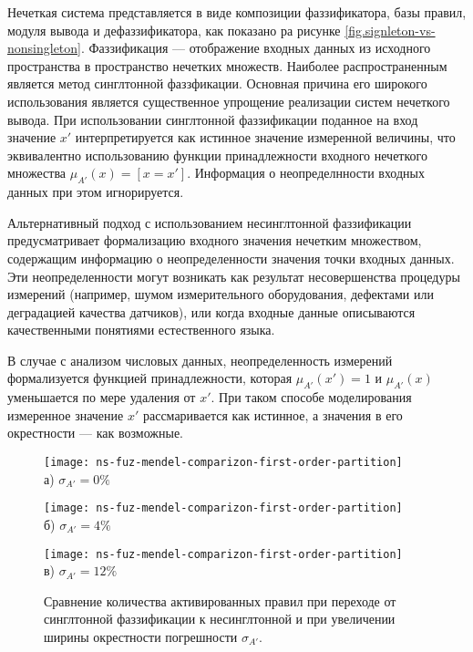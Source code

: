 Нечеткая система представляется в виде композиции фаззификатора, базы правил, модуля вывода и дефаззификатора, как показано ра рисунке \cref{fig.signleton-vs-nonsingleton}. Фаззификация --- отображение входных данных из исходного пространства в пространство нечетких множеств. Наиболее распространенным является метод синглтонной фаззфикации. Основная причина его широкого использования является существенное упрощение реализации систем нечеткого вывода. При использовании синглтонной фаззификации поданное на вход значение $x'$ интерпретируется как истинное значение измеренной величины, что эквивалентно использованию функции принадлежности входного нечеткого множества $\mu_{A'}(x) = \left[x = x'\right]$. Информация о неопределнности входных данных при этом игнорируется.

Альтернативный подход с использованием несинглтонной фаззификации предусматривает формализацию входного значения нечетким множеством, содержащим информацию о неопределенности значения точки входных данных. Эти неопределенности могут возникать как результат несовершенства процедуры измерений (например, шумом измерительного оборудования, дефектами или деградацией качества датчиков), или когда входные данные описываются качественными понятиями естественного языка.

В случае с анализом числовых данных, неопределенность измерений формализуется функцией принадлежности, которая $\mu_{A'}(x') = 1$ и $\mu_{A'}(x)$ уменьшается по мере удаления от $x'$. При таком способе моделирования измеренное значение $x'$ рассмаривается как истинное, а значения в его окрестности --- как возможные.

\begin{figure}[ht]
	\begin{minipage}[b][][b]{0.3\linewidth}
		\centering
		\texttt{[image: ns-fuz-mendel-comparizon-first-order-partition]} \\ а) $\sigma_{A'} = 0\%$
	\end{minipage}
	\hfill
	\begin{minipage}[b][][b]{0.3\linewidth}
		\centering
		\texttt{[image: ns-fuz-mendel-comparizon-first-order-partition]} \\ б) $\sigma_{A'} = 4\%$
	\end{minipage}
	\hfill
	\begin{minipage}[b][][b]{0.3\linewidth}
		\centering
		\texttt{[image: ns-fuz-mendel-comparizon-first-order-partition]} \\ в)  $\sigma_{A'} = 12\%$
	\end{minipage}

    \caption{Сравнение количества активированных правил при переходе от синглтонной фаззификации к несинглтонной и при увеличении ширины окрестности погрешности $\sigma_{A'}$.}
\end{figure}

